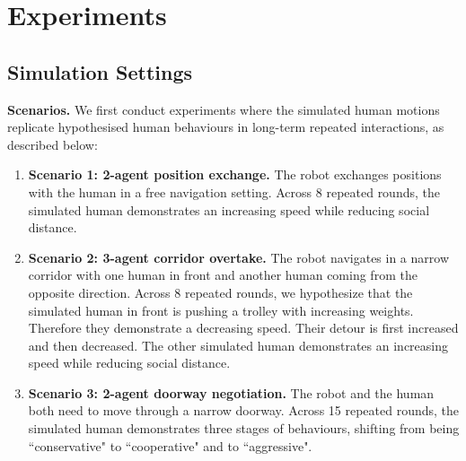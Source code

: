 \section{Experiments}

\subsection{Simulation Settings}
\label{sec:exp_settings}
\textbf{Scenarios.}
We first conduct experiments where the simulated human motions replicate hypothesised human behaviours in long-term repeated interactions, as described below:
\begin{enumerate}
    \item \textbf{Scenario 1: 2-agent position exchange.} The robot exchanges positions with the human in a free navigation setting. Across 8 repeated rounds, the simulated human demonstrates an increasing speed while reducing social distance.
    \item \textbf{Scenario 2: 3-agent corridor overtake.} The robot navigates in a narrow corridor with one human in front and another human coming from the opposite direction. Across 8 repeated rounds, we hypothesize that the simulated human in front is pushing a trolley with increasing weights. Therefore they demonstrate a decreasing speed. Their detour is first increased and then decreased. The other simulated human demonstrates an increasing speed while reducing social distance.
    \item \textbf{Scenario 3: 2-agent doorway negotiation.} The robot and the human both need to move through a narrow doorway. Across 15 repeated rounds, the simulated human demonstrates three stages of behaviours, shifting from being ``conservative" to ``cooperative" and to ``aggressive".
\end{enumerate}


